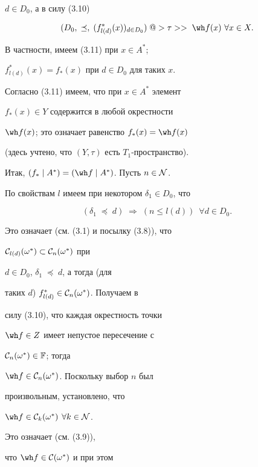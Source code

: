 \begin{pf}
$d \in {D_0}$, а в силу (3.10) 


\begin{equation}


({D_0},\;\preceq,\;


({f^*_{l(d)}}(x))_{d \in {D_0}})\;@>{\tau}>>\;


{{\wh f}(x)}\ \forall{x} \in X.


\end{equation}


В частности, имеем (3.11) при $x \in {A^*}$;


${f^*_{l(d)}}(x) = {f_*}(x)$ при $d \in {D_0}$ для таких $x$.


Согласно (3.11) имеем, что при $x \in {A^*}$ элемент


${f_*}(x) \in Y$ содержится в любой окрестности


${\wh f}(x)$; это означает равенство ${f_*}(x) = {\wh f}(x)$


(здесь учтено, что $(Y,\tau)$ есть $T_1$-пространство).


Итак, $({f_*} \mid {A^*}) = ({\wh f} \mid {A^*})$. Пусть $n \in {\cal N}$.


По свойствам $l$ имеем при некотором ${{\delta}_1} \in {D_0}$, что


$$


({{\delta}_1}\;\preceq\;d)\;\Longrightarrow\;


(n \le {l(d)}) \ \;\forall{d} \in {D_0}.


$$


Это означает (см. (3.1) и посылку (3.8)), что


${{\cal C}_{l(d)}}({\omega}^*) \subset {{\cal C}_n}({\omega}^*)$ при


$d \in {D_0}$, ${{\delta}_1}\;\preceq\;d$, а тогда (для


таких $d$) ${f^*_{l(d)}} \in {{\cal C}_n}({\omega}^*)$. Получаем в


силу (3.10), что каждая окрестность точки


${\wh f} \in Z$ имеет непустое пересечение с


${{\cal C}_n}({\omega}^*) \in {\Bbb F}$; тогда


${\wh f} \in {{\cal C}_n}({\omega}^*)$. Поскольку выбор $n$ был


произвольным, установлено, что 


${\wh f} \in {{\cal C}_k}({\omega}^*)$ $\forall{k} \in {\cal N}$.


Это означает (см. (3.9)),


что ${\wh f} \in {{\cal C}({\omega}^*)}$ и при этом



\end{pf}
